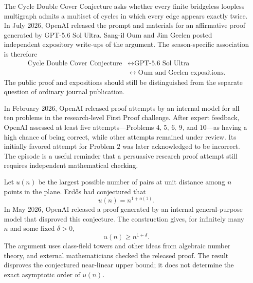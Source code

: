     \begin{fact}
        The Cycle Double Cover Conjecture asks whether every finite bridgeless
        loopless multigraph admits a multiset of cycles in which every edge
        appears exactly twice. In July 2026, OpenAI released the prompt and
        materials for an affirmative proof generated by GPT-5.6 Sol Ultra.
        Sang-il Oum and Jim Geelen posted independent expository write-ups of the
        argument. The season-specific association is therefore
        \[
            \begin{aligned}
                \text{Cycle Double Cover Conjecture}
                &\longleftrightarrow \text{GPT-5.6 Sol Ultra}\\
                &\longleftrightarrow \text{Oum and Geelen expositions}.
            \end{aligned}
        \]
        The public proof and expositions should still be distinguished from the
        separate question of ordinary journal publication.
    \end{fact}

    \begin{fact}
        In February 2026, OpenAI released proof attempts by an internal model for
        all ten problems in the research-level First Proof challenge. After
        expert feedback, OpenAI assessed at least five attempts---Problems $4$,
        $5$, $6$, $9$, and $10$---as having a high chance of being correct, while
        other attempts remained under review. Its initially favored attempt for
        Problem $2$ was later acknowledged to be incorrect. The episode is a
        useful reminder that a persuasive research proof attempt still requires
        independent mathematical checking.
    \end{fact}

    \begin{fact}
        Let $u(n)$ be the largest possible number of pairs at unit distance among
        $n$ points in the plane. Erd\H{o}s had conjectured that
        \[
            u(n)=n^{1+o(1)}.
        \]
        In May 2026, OpenAI released a proof generated by an internal
        general-purpose model that disproved this conjecture. The construction
        gives, for infinitely many $n$ and some fixed $\delta>0$,
        \[
            u(n)\geq n^{1+\delta}.
        \]
        The argument uses class-field towers and other ideas from algebraic
        number theory, and external mathematicians checked the released proof.
        The result disproves the conjectured near-linear upper bound; it does not
        determine the exact asymptotic order of $u(n)$.
    \end{fact}

